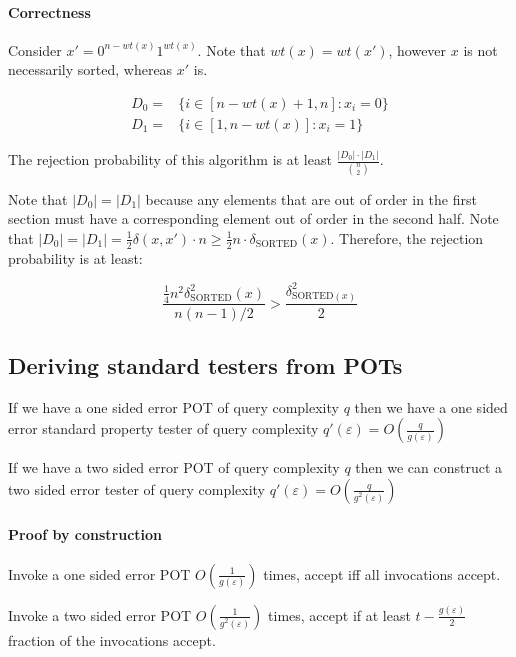 \documentclass{idc_msc}
\begin{document}
\paragraph{Correctness}

Consider \(x' = 0^{n - wt(x)} 1^{wt(x)}\). Note that \(wt(x) = wt(x')\), however \(x\) is not necessarily sorted, whereas \(x'\) is.

\[
\begin{aligned}
D_0 =& \{ i \in [n - wt(x) + 1, n] : x_i = 0 \} \\
D_1 =& \{ i \in [1, n - wt(x)] : x_i = 1\}
\end{aligned}
\]

The rejection probability of this algorithm is at least \(\frac{|D_0| \cdot |D_1|}{\binom{n}{2}}\).

Note that \(|D_0| = |D_1|\) because any elements that are out of order in the first section must have a corresponding element out of order in the second half.
Note that \(|D_0|=|D_1|=\frac{1}{2} \delta(x, x') \cdot n \ge \frac{1}{2} n \cdot \delta_{\mathrm{SORTED}}(x)\).
Therefore, the rejection probability is at least:

\[
  \frac{\frac{1}{4}n^2 \delta^2_{\mathrm{SORTED}}(x)}{n(n-1)/2} > \frac{\delta^2_{\mathrm{SORTED}(x)}}{2}
\]

\subsection{Deriving standard testers from POTs}

If we have a one sided error POT of query complexity \(q\) then we have a one sided error standard property tester of query complexity \(q'(\varepsilon) = O\left(\frac{q}{g(\varepsilon)}\right)\)

If we have a two sided error POT of query complexity \(q\) then we can construct a two sided error tester of query complexity \(q'(\varepsilon) = O\left(\frac{q}{g^2(\varepsilon)}\right)\)

\paragraph{Proof by construction}

Invoke a one sided error POT \(O\left(\frac{1}{g(\varepsilon)}\right)\) times, accept iff all invocations accept.

Invoke a two sided error POT \(O\left(\frac{1}{g^2(\varepsilon)}\right)\) times, accept if at least \(t - \frac{g(\varepsilon)}{2}\) fraction of the invocations accept.
\end{document}
